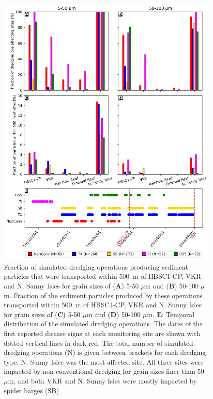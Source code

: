 \documentclass[preprint,12pt,authoryear]{elsarticle}
\begin{document}
\begin{figure}
	\centering
	\includegraphics[width=.85\textwidth]{figures/aggregated_stokes4_v3_500m_timeline_rel.png}
	\caption{Fraction of simulated dredging operations producing sediment particles that were transported within 500~m of HBSC1-CP, VKR and N. Sunny Isles for grain sizes of (\textbf{A}) 5-50 $\mu$m  and (\textbf{B}) 50-100 $\mu$m. Fraction of the sediment particles produced by these operations transported within 500~m of HBSC1-CP, VKR and N. Sunny Isles for grain sizes of (\textbf{C}) 5-50 $\mu$m  and (\textbf{D}) 50-100 $\mu$m. \textbf{E}: Temporal distribution of the simulated dredging operations. The dates of the first reported disease signs at each monitoring site are shown with dotted vertical lines in dark red. The total number of simulated dredging operations (N) is given between brackets for each dredging type. N. Sunny Isles was the most affected site. All three sites were impacted by non-conventional dredging for grain sizes finer than 50~$\mu$m, and both VKR and N. Sunny Isles were mostly impacted by spider barges (SB)}\label{fig:onset_bar}
\end{figure}
\end{document}
